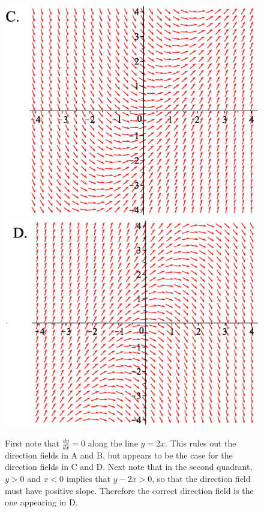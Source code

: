 \documentclass[noauthor]{ximera}
\begin{document}
\begin{problem}
\begin{figure}[!htb]
\endminipage

\end{figure}

\begin{figure}[!htb]
\hspace{10mm}  
\includegraphics[width=\linewidth]{MCC.eps} 

  \endminipage \hspace{10mm} 
%
  \includegraphics[width=\linewidth]{MCD.eps}

\endminipage

\begin{freeResponse}
First note that $\frac{dy}{dx}=0$ along the line $y=2x$. This rules out the direction fields in A and B, but appears to be the case for the direction fields in C and D. Next note that in the second quadrant, $y > 0$ and $x < 0$ implies that $y-2x > 0$, so that the direction field must have positive slope. Therefore the correct direction field is the one appearing in D.
\end{freeResponse}
\end{figure}


\end{problem}
\end{document}
